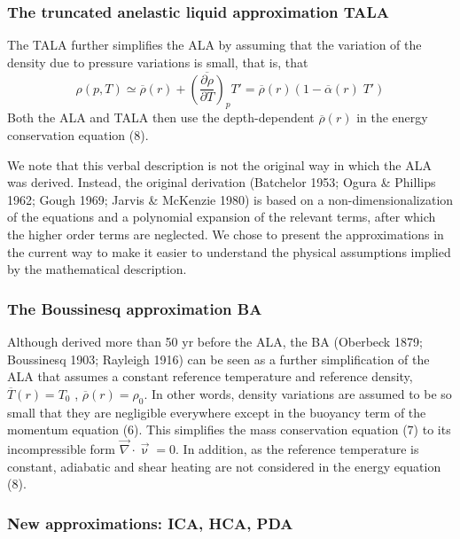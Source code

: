 \documentclass[a4paper,11pt]{article}
\begin{document}
\subsubsection{The truncated anelastic liquid approximation TALA}
\begin{displayquote}{\color{darkgray}
The TALA further simplifies the ALA by assuming that the variation
of the density due to pressure variations is small, that is, that
\[
\rho(p,T) \simeq \overline{\rho}(r) + 
\overline{\left( \frac{\partial \rho}{\partial T} \right)}_p T' 
=\overline{\rho}(r) \left( 1 -\overline{\alpha}(r) \; T'  \right)
\]
Both the ALA and TALA then use the depth-dependent $\overline{\rho}(r)$ 
in the energy conservation equation (8).


We note that this verbal description is not the original way in
which the ALA was derived. Instead, the original derivation (Batchelor 1953; 
Ogura \& Phillips 1962; Gough 1969; Jarvis \& McKenzie
1980) is based on a non-dimensionalization of the equations and a
polynomial expansion of the relevant terms, after which the higher
order terms are neglected. We chose to present the approximations
in the current way to make it easier to understand the physical
assumptions implied by the mathematical description.

}
\end{displayquote}


\subsubsection{The Boussinesq approximation BA}

\begin{displayquote}{\color{darkgray}
Although derived more than 50 yr before the ALA, the BA (Oberbeck 1879; Boussinesq 1903; 
Rayleigh 1916) can be seen as a
further simplification of the ALA that assumes a constant reference
temperature and reference density, $\overline{T}(r) = T_0$ 
, $\overline{\rho}(r)=\rho_0$. In other
words, density variations are assumed to be so small that they are
negligible everywhere except in the buoyancy term of the momentum equation (6). 
This simplifies the mass conservation equation
(7) to its incompressible form $\vec\nabla\cdot \vec\upnu=0$. 
In addition, as the reference temperature is constant, adiabatic and shear heating are not
considered in the energy equation (8).
}
\end{displayquote}


\subsubsection{New approximations: ICA, HCA, PDA}
\end{document}
